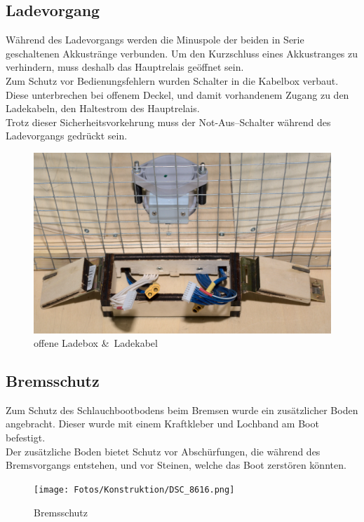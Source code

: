 \subsection{Ladevorgang}
Während des Ladevorgangs werden die Minuspole der beiden in Serie geschaltenen Akkustränge verbunden. Um den Kurzschluss eines Akkustranges zu verhindern, muss deshalb das Hauptrelais geöffnet sein.\\
Zum Schutz vor Bedienungsfehlern wurden Schalter in die Kabelbox verbaut. Diese unterbrechen bei offenem Deckel, und damit vorhandenem Zugang zu den Ladekabeln, den Haltestrom des Hauptrelais.\\
Trotz dieser Sicherheitsvorkehrung muss der Not-Aus--Schalter während des Ladevorgangs gedrückt sein.
\begin{figure}[H]
    \centering
    \includegraphics[width=\textwidth]{Fotos/Ladedeckel_DSC_8794.png}
    \caption{offene Ladebox \&\ Ladekabel}    
\end{figure}

\clearpage
\subsection{Bremsschutz}
Zum Schutz des Schlauchbootbodens beim Bremsen wurde ein zusätzlicher Boden angebracht. Dieser wurde mit einem Kraftkleber und Lochband am Boot befestigt.\\
Der zusätzliche Boden bietet Schutz vor Abschürfungen, die während des Bremsvorgangs entstehen, und vor Steinen, welche das Boot zerstören könnten.
\begin{figure}[H]
    \centering
    \texttt{[image: Fotos/Konstruktion/DSC\_8616.png]}
    \caption{Bremsschutz}    
\end{figure}

